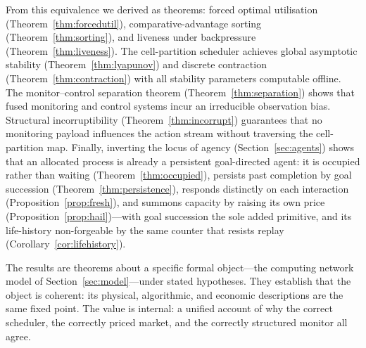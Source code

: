 \documentclass[11pt,twocolumn,a4paper]{article}
\theoremstyle{plain}
\theoremstyle{definition}
\theoremstyle{remark}
\begin{document}
From this equivalence we derived as theorems: forced optimal utilisation (Theorem~\ref{thm:forcedutil}), comparative-advantage sorting (Theorem~\ref{thm:sorting}), and liveness under backpressure (Theorem~\ref{thm:liveness}). The cell-partition scheduler achieves global asymptotic stability (Theorem~\ref{thm:lyapunov}) and discrete contraction (Theorem~\ref{thm:contraction}) with all stability parameters computable offline. The monitor--control separation theorem (Theorem~\ref{thm:separation}) shows that fused monitoring and control systems incur an irreducible observation bias. Structural incorruptibility (Theorem~\ref{thm:incorrupt}) guarantees that no monitoring payload influences the action stream without traversing the cell-partition map. Finally, inverting the locus of agency (Section~\ref{sec:agents}) shows that an allocated process is already a persistent goal-directed agent: it is occupied rather than waiting (Theorem~\ref{thm:occupied}), persists past completion by goal succession (Theorem~\ref{thm:persistence}), responds distinctly on each interaction (Proposition~\ref{prop:fresh}), and summons capacity by raising its own price (Proposition~\ref{prop:hail})---with goal succession the sole added primitive, and its life-history non-forgeable by the same counter that resists replay (Corollary~\ref{cor:lifehistory}).

The results are theorems about a specific formal object---the computing network model of Section~\ref{sec:model}---under stated hypotheses. They establish that the object is coherent: its physical, algorithmic, and economic descriptions are the same fixed point. The value is internal: a unified account of why the correct scheduler, the correctly priced market, and the correctly structured monitor all agree.



\end{document}
